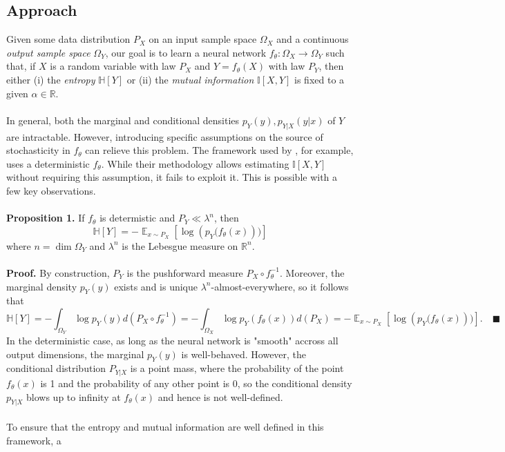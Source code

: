 \documentclass{NSF}
\newcommand{\E} {
    \mathop{\mathbb{E}}
}
\begin{document}
\subsection{Approach}
Given some data distribution $P_X$ on an input sample space $\Omega_X$ and a continuous
\textit{output sample space} $\Omega_Y$, our goal is to learn a neural network
$f_\theta: \Omega_X \rightarrow \Omega_Y$ such that, if $X$ is a random variable
with law $P_X$ and $Y=f_\theta(X)$ with law $P_Y$, then either (i) the \textit{entropy}
$\mathbb{H}[Y]$ or (ii) the \textit{mutual information} $\mathbb{I}[X,Y]$ is fixed
to a given $\alpha \in \mathbb{R}$.
\\
\\
In general, both the marginal and conditional densities $p_Y(y),p_{Y|X}(y|x)$ of $Y$ are
intractable. However, introducing specific assumptions on the source of stochasticity in
$f_\theta$ can relieve this problem. The framework used by \cite{hjelm2018learning}, for
example, uses a deterministic $f_\theta$. While their methodology allows estimating
$\mathbb{I}[X,Y]$ without requiring this assumption, it fails to exploit it. This is
possible with a few key observations.
\\
\\
\textbf{Proposition 1.} If $f_\theta$ is determistic and $P_Y \ll \lambda^n$, then
\[
    \mathbb{H}[Y]
    = -\E_{x\sim P_X}\left[\log \left(p_Y(f_\theta(x)\right))\right]
\]
where $n=\dim \Omega_Y$ and $\lambda^n$ is the Lebesgue measure on $\mathbb{R}^n$.
\\
\\
\textbf{Proof.} By construction, $P_Y$ is the pushforward
measure $P_X \circ f_\theta^{-1}$. Moreover, the marginal density $p_Y(y)$ exists and is
unique $\lambda^n$-almost-everywhere, so it follows that
\[
    \mathbb{H}[Y]
    = -\int_{\Omega_Y} \log p_Y(y) d(P_X \circ f_\theta^{-1})
    = -\int_{\Omega_X} \log p_Y(f_\theta(x)) d(P_X)
    = -\E_{x\sim P_X}\left[\log \left(p_Y(f_\theta(x)\right))\right].
    \quad\blacksquare
\]
In the deterministic case, as long as the neural network is "smooth" accross all output
dimensions, the marginal $p_Y(y)$ is well-behaved. However, the conditional distribution
$P_{Y|X}$ is a point mass, where the probability of the point $f_\theta(x)$ is 1 and the
probability of any other point is 0, so the conditional density $p_{Y|X}$ blows up to
infinity at $f_\theta(x)$ and hence is not well-defined.
\\
\\
To ensure that the entropy and mutual information are well defined in this framework, a
\end{document}
